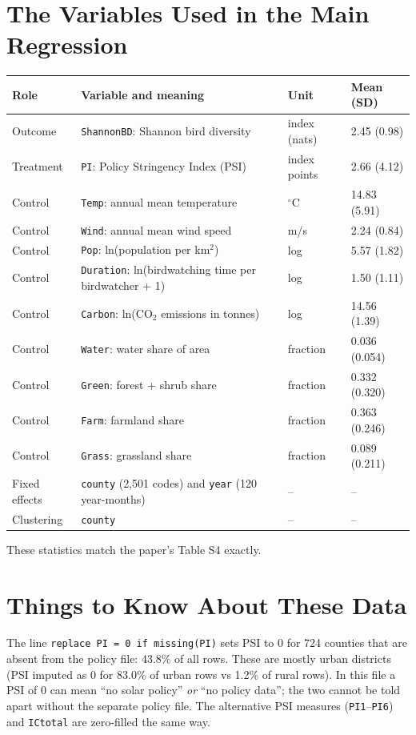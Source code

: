 \documentclass[10pt]{article}
\begin{document}
\section{The Variables Used in the Main Regression}
\begin{table}[H]\centering\small
\begin{tabularx}{\linewidth}{l>{\raggedright\arraybackslash}Xll}
\toprule
Role & Variable and meaning & Unit & Mean (SD)\\
\midrule
Outcome & \texttt{ShannonBD}: Shannon bird diversity & index (nats) & 2.45 (0.98)\\
Treatment & \texttt{PI}: Policy Stringency Index (PSI) & index points & 2.66 (4.12)\\
Control & \texttt{Temp}: annual mean temperature & $^\circ$C & 14.83 (5.91)\\
Control & \texttt{Wind}: annual mean wind speed & m/s & 2.24 (0.84)\\
Control & \texttt{Pop}: ln(population per km$^2$) & log & 5.57 (1.82)\\
Control & \texttt{Duration}: ln(birdwatching time per birdwatcher + 1) & log & 1.50 (1.11)\\
Control & \texttt{Carbon}: ln(CO$_2$ emissions in tonnes) & log & 14.56 (1.39)\\
Control & \texttt{Water}: water share of area & fraction & 0.036 (0.054)\\
Control & \texttt{Green}: forest + shrub share & fraction & 0.332 (0.320)\\
Control & \texttt{Farm}: farmland share & fraction & 0.363 (0.246)\\
Control & \texttt{Grass}: grassland share & fraction & 0.089 (0.211)\\
Fixed effects & \texttt{county} (2,501 codes) and \texttt{year} (120 year-months) & -- & --\\
Clustering & \texttt{county} & -- & --\\
\bottomrule
\end{tabularx}
\end{table}
\noindent These statistics match the paper's Table S4 exactly.

\section{Things to Know About These Data}

\begin{warnbox}
\small
The line \texttt{replace PI = 0 if missing(PI)} sets PSI to 0 for 724 counties that are absent from the policy file: 43.8\% of all rows. These are mostly urban districts (PSI imputed as 0 for 83.0\% of urban rows vs 1.2\% of rural rows). In this file a PSI of 0 can mean ``no solar policy'' \emph{or} ``no policy data''; the two cannot be told apart without the separate policy file. The alternative PSI measures (\texttt{PI1}--\texttt{PI6}) and \texttt{ICtotal} are zero-filled the same way.
\end{warnbox}
\end{document}
